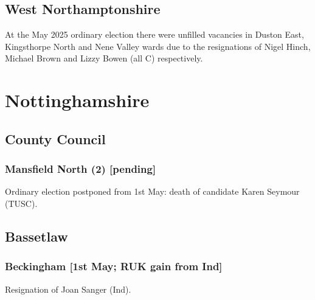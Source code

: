 \documentclass[a4paper,openany]{book}
\begin{document}
\begin{resultsiii}
\subsection*{West Northamptonshire}

At the May 2025 ordinary election there were unfilled vacancies in Duston East, Kingsthorpe North and Nene Valley wards due to the resignations of Nigel Hinch, Michael Brown and Lizzy Bowen (all C) respectively.%

\section{Nottinghamshire}

\subsection*{County Council}

\subsubsection*{Mansfield North (2) \hspace*{\fill}\nolinebreak[1]%
	\enspace\hspace*{\fill}
	[pending]}


Ordinary election postponed from 1st May: death of candidate Karen Seymour (TUSC).

\subsection*{Bassetlaw}

\subsubsection*{Beckingham \hspace*{\fill}\nolinebreak[1]%
	\enspace\hspace*{\fill}
	[1st May; RUK gain from Ind]}


Resignation of Joan Sanger (Ind).


\end{resultsiii}
\end{document}
